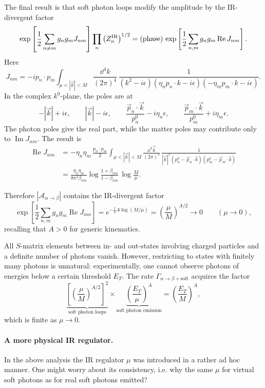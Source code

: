 The final result is that soft photon loops modify the amplitude by the
IR-divergent factor
\[
  \exp\left[
    \frac12\sum_{n\ne m}g_ng_mJ_{nm}
  \right]
  \prod_n\left(Z_n^{\mathrm{IR}}\right)^{1/2}
  =
  (\text{phase})\,
  \exp\left[
    \frac12\sum_{n,m}g_ng_m\operatorname{Re}J_{nm}
  \right].
\]
Here
\[
  J_{nm}
  =
  -i p_n\cdot p_m
  \int_{\mu<|\vec k|<M}
  \frac{\dd^4k}{(2\pi)^4}\,
  \frac{1}
  {(k^2-i\epsilon)
   (\eta_n p_n\cdot k-i\epsilon)
   (-\eta_m p_m\cdot k-i\epsilon)}.
\]
In the complex \(k^0\)-plane, the poles are at
\[
  -|\vec k|+i\epsilon,\qquad
  |\vec k|-i\epsilon,\qquad
  \frac{\vec p_n\cdot\vec k}{p_n^0}-i\eta_n\epsilon,\qquad
  \frac{\vec p_m\cdot\vec k}{p_m^0}+i\eta_m\epsilon .
\]
The photon poles give the real part, while the matter poles may
contribute only to \(\operatorname{Im}J_{nm}\).  The result is
\[
\begin{aligned}
  \operatorname{Re}J_{nm}
  &=
  -\eta_n\eta_m\,\frac{p_n\cdot p_m}{2}
  \int_{\mu<|\vec k|<M}
  \frac{\dd^3\vec k}{(2\pi)^3}\,
  \frac{1}
  {|\vec k|^3
   (p_n^0-\vec p_n\cdot\widehat k)
   (p_m^0-\vec p_m\cdot\widehat k)}
\\
  &=
  \frac{\eta_n\eta_m}{8\pi^2\beta_{nm}}
  \log\frac{1+\beta_{nm}}{1-\beta_{nm}}\,
  \log\frac{M}{\mu}.
\end{aligned}
\]

Therefore \(|\mathcal A_{\alpha\to\beta}|\) contains the IR-divergent
factor
\[
  \exp\left[
    \frac12\sum_{n,m}g_ng_m\operatorname{Re}J_{nm}
  \right]
  =
  e^{-\frac12A\log(M/\mu)}
  =
  \left(\frac{\mu}{M}\right)^{A/2}
  \longrightarrow 0
  \qquad(\mu\to0),
\]
recalling that \(A>0\) for generic kinematics.

All \(S\)-matrix elements between in- and out-states involving charged
particles and a definite number of photons vanish.  However, restricting
to states with finitely many photons is unnatural: experimentally, one
cannot observe photons of energies below a certain threshold \(E_T\).
The rate \(\Gamma_{\alpha\to\beta+\mathrm{soft}}\) acquires the factor
\[
  \underbrace{\left[
    \left(\frac{\mu}{M}\right)^{A/2}
  \right]^2}_{\text{soft photon loops}}
  \times
  \underbrace{\left(\frac{E_T}{\mu}\right)^A}
    _{\text{soft photon emission}}
  =
  \left(\frac{E_T}{M}\right)^A,
\]
which is finite as \(\mu\to0\).

\paragraph{A more physical IR regulator.}
In the above analysis the IR regulator \(\mu\) was introduced in a rather
ad hoc manner.  One might worry about its consistency, i.e. why the same
\(\mu\) for virtual soft photons as for real soft photons emitted?

